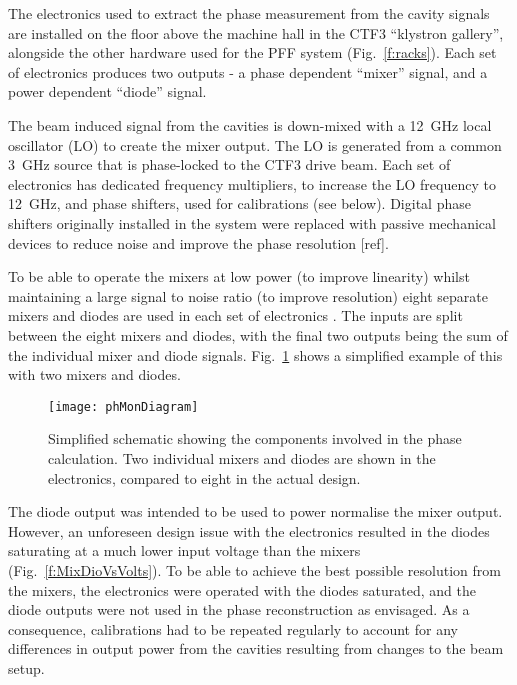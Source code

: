 The electronics used to extract the phase measurement from the cavity signals 
are installed on the floor above the machine hall in the CTF3 ``klystron 
gallery'', alongside the other hardware used for the PFF system 
(Fig.~\ref{f:racks}). 
Each set of electronics produces two outputs - a phase 
dependent ``mixer'' signal, and a power dependent ``diode'' signal. 

The beam induced signal from the cavities is down-mixed with a 12~GHz local 
oscillator (LO) to create the mixer output. The LO is generated 
from a common 3~GHz source that is phase-locked to the CTF3 drive beam.
Each set of electronics has dedicated frequency multipliers, to increase the LO 
frequency to 12~GHz, and phase shifters, used for calibrations (see below). 
Digital phase shifters originally installed in the system were replaced with 
passive mechanical devices to reduce noise and improve the phase resolution 
[ref].

To be able to operate the mixers at low power (to improve linearity) whilst 
maintaining a large signal to noise ratio (to improve resolution) eight 
separate mixers and diodes are used in each set of electronics \cite{alex09}. 
The inputs are split between the eight mixers and diodes, with the final two 
outputs being the sum of the individual mixer and diode signals. 
Fig.~\ref{f:phMonDiagram} shows a simplified example of this with two 
mixers and diodes. 

\begin{figure}
  \texttt{[image: phMonDiagram]}%
  \caption{\label{f:phMonDiagram}Simplified schematic showing the components 
  involved in the phase calculation. Two individual mixers and diodes are 
  shown in the electronics, compared to eight in the actual design.}
\end{figure}

The diode output was intended to be used to power normalise the mixer output. 
However, an unforeseen design issue with the electronics resulted in the diodes 
saturating at a much lower input voltage than the mixers 
(Fig.~\ref{f:MixDioVsVolts}). To be able to achieve the best possible 
resolution from the mixers, the electronics were operated with the diodes 
saturated, and the diode outputs were not used in the phase reconstruction as 
envisaged. As a consequence, calibrations had to be repeated regularly to 
account for any differences in output power from the cavities resulting from 
changes to the beam setup.

